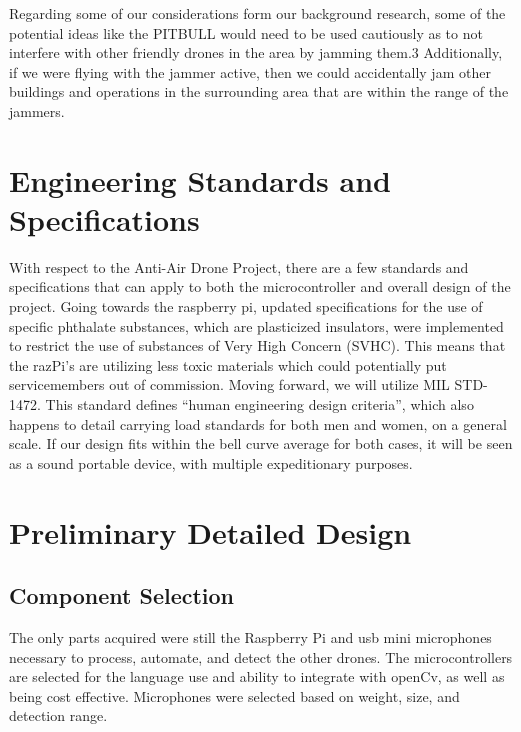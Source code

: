 \documentclass[10pt]{article}
\begin{document}
Regarding some of our considerations form our background research, some of the potential ideas like the PITBULL would need to be used cautiously as to not interfere with other friendly drones in the area by jamming them.3  Additionally, if we were flying with the jammer active, then we could accidentally jam other buildings and operations in the surrounding area that are within the range of the jammers.

\section{Engineering Standards and Specifications}
With respect to the Anti-Air Drone Project, there are a few standards and specifications that can apply to both the microcontroller and overall design of the project. Going towards the raspberry pi, updated specifications for the use of specific phthalate substances, which are plasticized insulators, were implemented to restrict the use of substances of Very High Concern (SVHC). This means that the razPi’s are utilizing less toxic materials which could potentially put servicemembers out of commission. Moving forward, we will utilize  MIL STD-1472.  This standard defines “human engineering design criteria”, which also happens to detail carrying load standards for both men and women, on a general scale. If our design fits within the bell curve average for both cases, it will be seen as a sound portable device, with multiple expeditionary purposes.

\section{Preliminary Detailed Design}
\subsection{Component Selection}
The only parts acquired were still the Raspberry Pi and usb mini microphones necessary to process, automate, and detect the other drones. The microcontrollers are selected for the language use and ability to integrate with openCv, as well as being cost effective. Microphones were selected based on weight, size, and detection range.  
\end{document}
